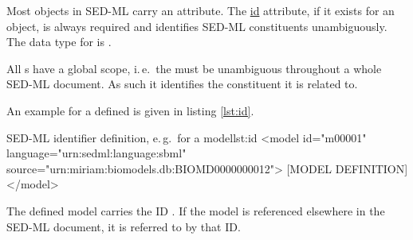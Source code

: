 \label{sec:id}
%

Most objects in SED-ML carry an  attribute. 
The \hyperref[sec:id]{id} attribute, if it exists for an object, is always required and identifies SED-ML constituents unambiguously.   
The data type for   is . 

All s have a global scope, i.\,e.\ the  must be unambiguous throughout a whole SED-ML document. As such it identifies the constituent it is related to.

An example for a defined  is given in listing \ref{lst:id}.
%
\begin{myXmlLst}{SED-ML identifier definition, e.\,g.\ for a model}{lst:id}
<model id="m00001" language="urn:sedml:language:sbml" source="urn:miriam:biomodels.db:BIOMD0000000012">
 [MODEL DEFINITION]
</model>
\end{myXmlLst}
%
The defined model carries the ID . If the model is referenced elsewhere in the SED-ML document, it is referred to by that ID.

